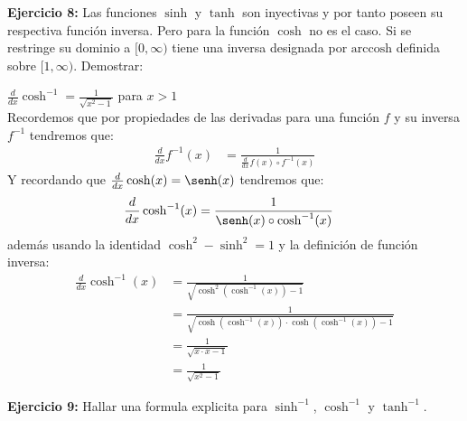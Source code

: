 \documentclass[../main.tex]{subfiles}
\begin{document}
\question \textbf{Ejercicio 8:} Las funciones $\sinh$ y $\tanh$ son inyectivas y por tanto poseen su respectiva función inversa. Pero para la función $\cosh$ no es el caso. Si se restringe su dominio a $[0, \infty)$ tiene una inversa designada por $\text{arccosh}$ definida sobre $[1, \infty)$. Demostrar:
\begin{partes}
    \parte $\frac{d}{dx} \cosh^{-1} = \frac{1}{\sqrt{x^2-1}}$ para $x > 1$\\
    Recordemos que por propiedades de las derivadas para una función $f$ y su inversa $f^{-1}$ tendremos que:
    \begin{align*}
        \frac{d}{dx} f^{-1}(x) &= \frac{1}{\frac{d}{dx} f(x) \circ f^{-1}(x)}
    \end{align*}
    Y recordando que $\frac{d}{dx} \cosh(x) = \senh(x)$ tendremos que:
    \begin{align*}
        \frac{d}{dx} \cosh^{-1}(x) &= \frac{1}{\senh(x) \circ \cosh^{-1}(x)}
    \end{align*}
    además usando la identidad $\cosh^2 - \sinh^2 = 1$ y la definición de función inversa:
    \begin{align*}
        \frac{d}{dx} \cosh^{-1}(x) &= \frac{1}{\sqrt{\cosh^2(\cosh^{-1}(x)) - 1}}\\
        &= \frac{1}{\sqrt{\cosh(\cosh^{-1}(x)) \cdot \cosh(\cosh^{-1}(x)) - 1}}\\
        &=  \frac{1}{\sqrt{x \cdot x - 1}}\\
        &= \frac{1}{\sqrt{x^2-1}}
    \end{align*}
\end{partes}

\question \textbf{Ejercicio 9:} Hallar una formula explicita para $\sinh^{-1}$, $\cosh^{-1}$ y $\tanh^{-1}$.\\
\end{document}
